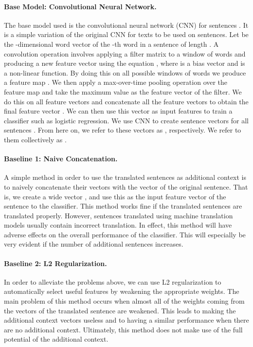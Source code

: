 \documentclass{article}
\begin{document}
\paragraph{Base Model: Convolutional Neural Network.}

The base model used is the convolutional neural network (CNN) for sentences \cite{Kim2014ConvolutionalNN}. It is a simple variation of the original CNN for texts \cite{collobert2011natural} to be used on sentences. Let  be the -dimensional word vector of the -th word in a sentence of length . A convolution operation involves applying a filter matrix  to a window of  words and producing a new feature vector  using the equation , where  is a bias vector and  is a non-linear function.
By doing this on all possible windows of words we produce a feature map . We then apply a max-over-time pooling operation \cite{collobert2011natural} over the feature map and take the maximum value as the feature vector of the filter. We do this on all feature vectors and concatenate all the feature vectors to obtain the final feature vector . We can then use this vector as input features to train a classifier such as logistic regression.
We use CNN to create sentence vectors for all sentences . From here on, we refer to these vectors as , respectively. We refer to them collectively as .

\paragraph{Baseline 1: Naive Concatenation.}

A simple method in order to use the translated sentences as additional context is to naively concatenate their vectors with the vector of the original sentence. That is, we create a wide vector , and use this as the input feature vector of the sentence to the 
classifier.
This method works fine if the translated sentences are translated properly. However, sentences translated using machine translation models usually contain incorrect translation. In effect, this method will have adverse effects on the overall performance of the classifier. This will especially be very evident if the number of additional sentences increases.

\paragraph{Baseline 2: L2 Regularization.}

In order to alleviate the problems above, we can use L2 regularization to automatically select useful features by weakening the appropriate weights. The main problem of this method occurs when almost all of the weights coming from the vectors of the translated sentence are weakened. This leads to making the additional context vectors useless and to having a similar performance when there are no additional context. Ultimately, this method does not make use of the full potential of the additional context.
\end{document}
